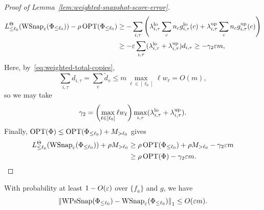 \begin{proof}[Proof of Lemma~\ref{lem:weighted-snapshot-score-error}]
\[
\begin{aligned}
  L_{\le\ell_0}^\Theta(\operatorname{WSnap}_{\varepsilon}(\Phi_{\le\ell_0}))-\rho\operatorname{OPT}(\Phi_{\le\ell_0})
  &\ge-\sum_{i,\tau}\left(
    \lambda^{\rm lo}_{i,\tau}\sum_c n_cg^{\rm lo}_{i,\tau}(c)
    +\lambda^{\rm up}_{i,\tau}\sum_c n_cg^{\rm up}_{i,\tau}(c)\right)\\
  &\ge-\varepsilon\sum_{i,\tau}(\lambda^{\rm lo}_{i,\tau}+\lambda^{\rm up}_{i,\tau})d_{i,\tau}
  \ge-\gamma_2\varepsilon m,
\end{aligned}
\]
Here, by~\eqref{eq:weighted-total-copies},
\[
  \sum_{i,\tau}d_{i,\tau}=\sum_v\widetilde d_v
  \le m\max_{\ell\in[\ell_0]}\ell w_\ell=O(m),
\]
so we may take
\[
  \gamma_2=\left(\max_{\ell\in[\ell_0]}\ell w_\ell\right)
      \max_{i,\tau}(\lambda^{\rm lo}_{i,\tau}+\lambda^{\rm up}_{i,\tau}).
\]
Finally, $\operatorname{OPT}(\Phi)\le\operatorname{OPT}(\Phi_{\le\ell_0})+M_{>\ell_0}$ gives
\[
\begin{aligned}
  L_{\le\ell_0}^\Theta(\operatorname{WSnap}_{\varepsilon}(\Phi_{\le\ell_0}))+\rho M_{>\ell_0}
  &\ge\rho\operatorname{OPT}(\Phi_{\le\ell_0})+\rho M_{>\ell_0}-\gamma_2\varepsilon m\\
  &\ge\rho\operatorname{OPT}(\Phi)-\gamma_2\varepsilon m.
\end{aligned}
\]
\end{proof}

\begin{restatedclosenesslemma}
With probability at least $1-O(\varepsilon)$ over $\{f_a\}$ and $g$, we have
\[
  \left\lVert \operatorname{WPsSnap}(\Phi_{\le\ell_0})-\operatorname{WSnap}_{\varepsilon}(\Phi_{\le\ell_0}) \right\rVert_1
  \le O(\varepsilon m).
\]
\end{restatedclosenesslemma}


